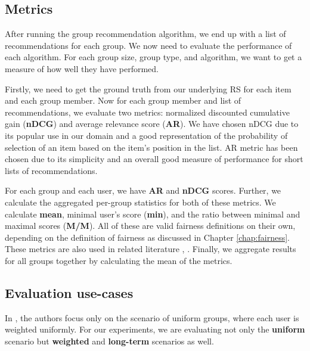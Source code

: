 \subsection{Metrics}\label{subsec:07_experiments.evaluation.metrics}

After running the group recommendation algorithm, we end up with a list of recommendations for each group. We now need to evaluate the performance of each algorithm.
For each group size, group type, and algorithm, we want to get a measure of how well they have performed.

Firstly, we need to get the ground truth from our underlying RS for each item and each group member.
Now for each group member and list of recommendations, we evaluate two metrics: normalized discounted cumulative gain (\textbf{nDCG}) and average relevance score (\textbf{AR}). We have chosen nDCG due to its popular use in our domain and a good representation of the probability of selection of an item based on the item's position in the list. AR metric has been chosen due to its simplicity and an overall good measure of performance for short lists of recommendations.

For each group and each user, we have \textbf{AR} and \textbf{nDCG} scores. Further, we calculate the aggregated per-group statistics for both of these metrics. We calculate \textbf{mean}, minimal user's score (\textbf{min}), and the ratio between minimal and maximal scores (\textbf{M/M}). All of these are valid fairness definitions on their own, depending on the definition of fairness as discussed in Chapter \ref{chap:fairness}. These metrics are also used in related literature \cite{GFAR-kaya2020}, \cite{sacharidis_2019_top_n_with_fairness}. Finally, we aggregate results for all groups together by calculating the mean of the metrics.

\subsection{Evaluation use-cases}\label{subsec:07_experiments.evaluation.use_cases}

In \cite{GFAR-kaya2020}, the authors focus only on the scenario of uniform groups, where each user is weighted uniformly. For our experiments, we are evaluating not only the \textbf{uniform} scenario but \textbf{weighted} and \textbf{long-term} scenarios as well.

